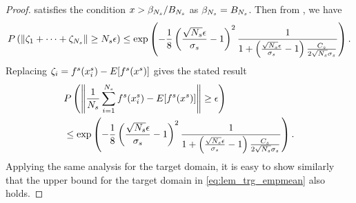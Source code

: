 \documentclass[review,supplement,onefignum,onetabnum]{siamonline250211}
\begin{document}
\begin{proof}
%
satisfies the condition $x>\beta_{N_s} / B_{N_s}$ as $\beta_{N_s} = B_{N_s}$. Then from \cite[Theorem 2.1]{Yurinski76}, we have
%
\begin{equation*}
\begin{split}
P\left(   \| \zeta_1 + \dots + \zeta_{N_s} \|  \geq N_s \epsilon \right) \leq
  \exp \left(  
  -\frac{1}{8}\left( \frac{\sqrt{N_s} \epsilon}{\sigma_s} -1\right)^2 \frac{1}{1+\left( \frac{\sqrt{N_s} \epsilon}{\sigma_s} -1 \right)\frac{C_s}{2 \sqrt{N_s} \sigma_s }}
   \right).
\end{split}
\end{equation*}
%
Replacing  $\zeta_i = f^s(x^s_i)- E[f^s(x^s)]$ gives the stated result
%
\begin{equation*}
\begin{split}
&P\left( \left \|  \frac{1}{N_s}  \sum_{i=1}^{N_s}  f^s(x^s_i)  -  E[f^s(x^s)] \right \|  \geq  \epsilon \right) \\
&\leq
  \exp \left(  
  -\frac{1}{8}\left( \frac{\sqrt{N_s} \epsilon}{\sigma_s} -1\right)^2 \frac{1}{1+\left( \frac{\sqrt{N_s} \epsilon}{\sigma_s} -1 \right)\frac{C_s}{2 \sqrt{N_s} \sigma_s }}
   \right).
\end{split}
\end{equation*}
%
Applying the same analysis for the target domain, it is easy to show similarly that the upper bound for the target domain in \eqref{eq:lem_trg_empmean} also holds. 
%
\end{proof}
\end{document}
